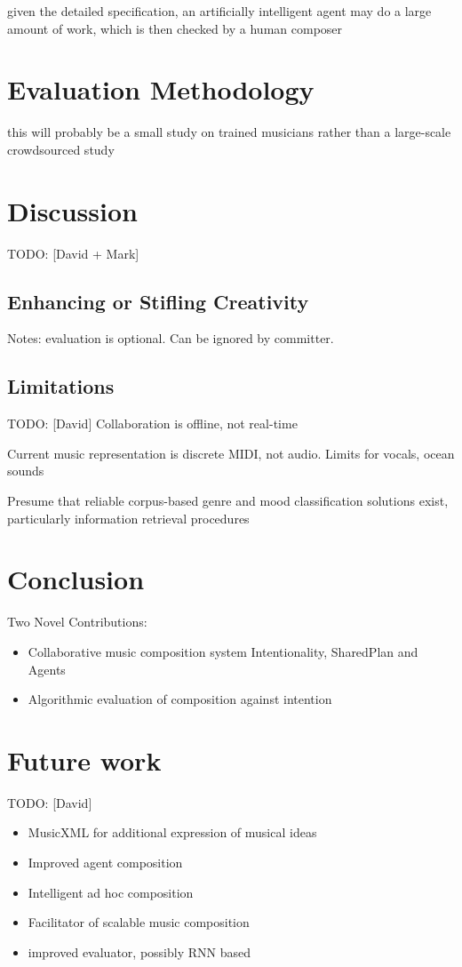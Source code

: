\documentclass[final,authoryear,11pt,times]{elsarticle}
\begin{document}
given the detailed specification, an artificially intelligent agent may do a large amount of work, which is then checked by a human composer


\section{Evaluation Methodology}

this will probably be a small study on trained musicians rather than a large-scale crowdsourced study


\section{Discussion}

TODO: [David + Mark]
\subsection{Enhancing or Stifling Creativity}

Notes: evaluation is optional. Can be ignored by committer.

\subsection{Limitations}

TODO: [David]
Collaboration is offline, not real-time

Current music representation is discrete MIDI, not audio. Limits for vocals, ocean sounds

Presume that reliable corpus-based genre and mood classification solutions exist, particularly information retrieval procedures


\section{Conclusion}
 Two Novel Contributions:
 \begin{itemize}
\item Collaborative music composition system 
Intentionality, SharedPlan and Agents
\item Algorithmic evaluation of composition against intention
\end{itemize}

\section {Future work}
TODO: [David]

\begin{itemize}
\item MusicXML for additional expression of musical ideas
\item Improved agent composition
\item Intelligent ad hoc composition
\item Facilitator of scalable music composition
\item improved evaluator, possibly RNN based
\end{itemize}
\end{document}
